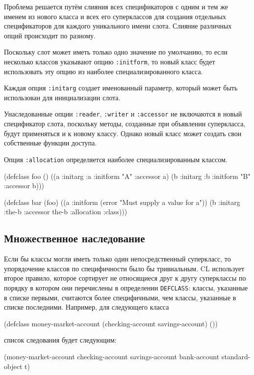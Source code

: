 Проблема решается путём слияния всех спецификаторов с одним и тем же именем из нового класса и всех его суперклассов для создания отдельных спецификаторов для каждого уникального имени слота. Слияние различных опций происходит по разному.

Поскольку слот может иметь только одно значение по умолчанию, то если несколько классов указывают опцию \lstinline{:initform}, то новый класс будет использовать эту опцию из наиболее специализированного класса.

Каждая опция \lstinline{:initarg} создает именованный параметр, который может быть использован для инициализации слота.

Унаследованные опции \lstinline{:reader}, \lstinline{:writer} и \lstinline{:accessor} не включаются в новый спецификатор слота, поскольку методы, созданные при объявлении суперкласса, будут применяться и к новому классу. Однако новый класс может создать свои собственные функции доступа.

Опция \lstinline{:allocation} определяется наиболее специализированным классом.
\begin{cllst}{}{}
(defclass foo ()
  ((a :initarg :a :initform "A" :accessor a)
   (b :initarg :b :initform "B" :accessor b)))
 
(defclass bar (foo)
  ((a :initform (error "Must supply a value for a"))
   (b :initarg :the-b :accessor the-b :allocation :class)))
\end{cllst}

\subsection{Множественное наследование}
Если бы классы могли иметь только один непосредственный суперкласс, то упорядочение классов по специфичности было бы тривиальным. CL использует второе правило, которое сортирует не относящиеся друг к другу суперклассы по порядку в котором они перечислены в определении \lstinline{DEFCLASS}: классы, указанные в списке первыми, считаются более специфичными, чем классы, указанные в списке последними. Например, для следующего класса
\begin{cllst}{}{}
(defclass money-market-account (checking-account savings-account) ())
\end{cllst}
список следования будет следующим:
\begin{cllst}{}{}
(money-market-account
 checking-account
 savings-account
 bank-account
 standard-object
 t)
\end{cllst}


